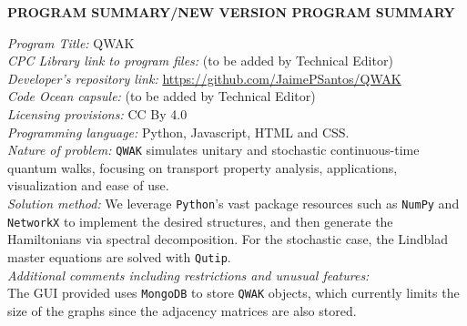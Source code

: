 \documentclass[preprint,12pt]{elsarticle}
\begin{document}


{\bf PROGRAM SUMMARY/NEW VERSION PROGRAM SUMMARY}

\begin{small}
\noindent
{\em Program Title: }QWAK                                          \\
{\em CPC Library link to program files:} (to be added by Technical Editor) \\
{\em Developer's repository link: } \url{https://github.com/JaimePSantos/QWAK}\\
{\em Code Ocean capsule:} (to be added by Technical Editor)\\
{\em Licensing provisions:} CC By 4.0 \\
{\em Programming language: } Python, Javascript, HTML and CSS.                                  \\
{\em Nature of problem:}
  \texttt{QWAK} simulates unitary and stochastic continuous-time quantum walks,
  focusing on transport property analysis, applications, visualization and ease
  of use.\\
{\em Solution method:}
 We leverage \texttt{Python}'s vast package resources such as \texttt{NumPy}
 and \texttt{NetworkX} to implement the desired structures, and then generate
 the Hamiltonians via spectral decomposition. For the stochastic case, the
 Lindblad master equations are solved with \texttt{Qutip}.\\
{\em Additional comments including restrictions and unusual features:}\\
  The GUI provided uses \texttt{MongoDB} to store \texttt{QWAK} objects, which
  currently limits the size of the graphs since the adjacency matrices are also
  stored.  \\
\end{small}
\end{document}
